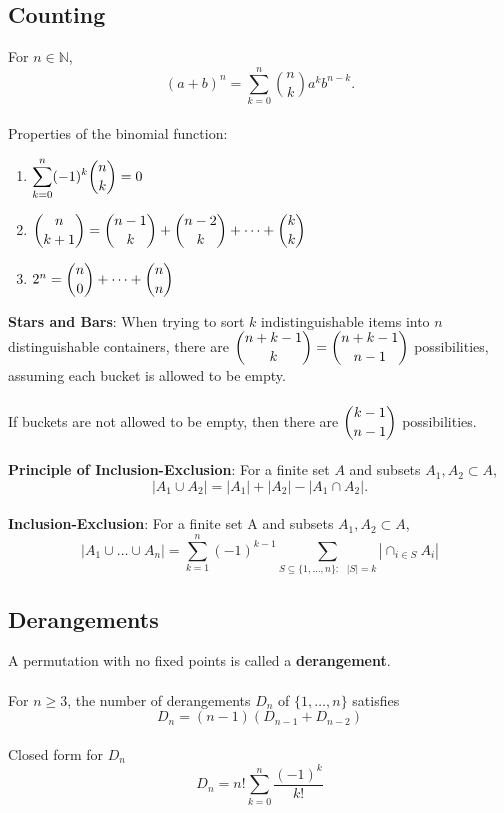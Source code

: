 \documentclass{article}
\theoremstyle{definition}
\begin{document}
\subsection*{Counting}
For $n \in \mathbb{N}$, $$(a + b)^n = \sum_{k = 0}^n {n \choose k}a^kb^{n - k}.$$ \\
Properties of the binomial function: \begin{enumerate}
\item $\mathlarger{\sum_{k = 0}^n (-1)^k{n \choose k}} = 0$
\item $\mathlarger{{n \choose k + 1} = {n - 1 \choose k} + {n - 2 \choose k} + \dots + {k \choose k}}$
\item $2^n = \mathlarger{{n \choose 0} + \dots + {n \choose n}}$
\end{enumerate} $ $ \\
\textbf{Stars and Bars}: When trying to sort $k$ indistinguishable items into $n$ distinguishable containers, there are $\mathlarger{{n + k - 1 \choose k} = {n + k - 1 \choose n - 1}}$ possibilities, assuming each bucket is allowed to be empty. \\ \\
If buckets are not allowed to be empty, then there are $\mathlarger{{k - 1 \choose n - 1}}$ possibilities. \\ \\
\textbf{Principle of Inclusion-Exclusion}: For a finite set $A$ and subsets $A_1, A_2 \subset A$, $$|A_1 \cup A_2| = |A_1| + |A_2| - |A_1 \cap A_2|.$$ \\
\textbf{Inclusion-Exclusion}: For a finite set A and subsets $A_1, A_2 \subset A$, $$|A_1 \cup \dots \cup A_n| = \sum_{k = 1}^n (-1)^{k - 1} \sum_{S \subseteq \{1, \dots, n\}: \text{ } |S| = k}|\cap_{i \in S}A_i|$$
\subsection*{Derangements}
A permutation with no fixed points is called a \textbf{derangement}. \\ \\
For $n \geq 3$, the number of derangements $D_n$ of $\{1, \dots, n\}$ satisfies $$D_n = (n - 1)(D_{n - 1} + D_{n - 2})$$ \\
Closed form for $D_n$
$$D_n = n!\sum_{k = 0}^n \frac{(-1)^k}{k!}$$
\end{document}
